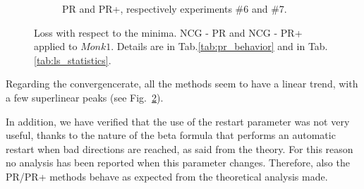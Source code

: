 \documentclass[11pt]{article}
\begin{document}
\begin{figure}[H]
\begin{subfigure}[b]{.497\textwidth}
         \caption{PR and PR+, respectively experiments \#6 and \#7.}
         \label{fig:monk1_pr_pr+_206}
     \end{subfigure}
    \caption{Loss with respect to the minima. NCG - PR and NCG - PR+ applied to $Monk1$. Details are in Tab.\ref{tab:pr_behavior} and in Tab.\ref{tab:ls_statistics}.}
    \label{fig:monk1_pr_pr+}
\end{figure}


Regarding the convergencerate, all the methods seem to have a linear trend, with a few superlinear peaks (see Fig.~\ref{fig:monk1_pr_pr+}). 

In addition, we have verified that the use of the restart parameter was not very useful, thanks to the nature of the beta formula that performs an automatic restart when bad directions are reached, as said from the theory. For this reason no analysis has been reported when this parameter changes. Therefore, also the PR/PR+ methods behave as expected from the theoretical analysis made.

\end{document}

